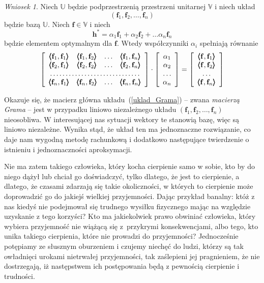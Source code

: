 \documentclass[12pt]{mwbk}
\theoremstyle{plain}
\theoremstyle{definition}
\theoremstyle{remark}
\newtheorem{wniosek}{Wniosek}[chapter]
\newcommand{\ff}{\mathbf{f}}
\newcommand{\hh}{\mathbf{h}}
\newcommand{\skalar}[2]{\pmb{\langle}#1,#2\pmb{\rangle}}
\begin{document}
\begin{wniosek}
	Niech $\mathbb{U}$ będzie podprzestrzenią przestrzeni
	unitarnej $\mathbb{V}$ i niech układ \[(\ff_1,\ff_2,
	\ldots,\ff_n)\] będzie bazą $\mathbb{U}$. Niech
	$\ff\in\mathbb{V}$ i niech 
	\[
	\hh^*=
	\alpha_1\ff_1 +
	\alpha_2\ff_2 +
	\ldots
	\alpha_n\ff_n
	\]
	będzie elementem optymalnym dla $\ff$. Wtedy współczynniki
	$\alpha_i$ spełniają równanie
	\begin{equation}
		\left[
		\begin{array}{cccc}
			\skalar{\ff_1}{\ff_1} &
			\skalar{\ff_1}{\ff_2} &
			\ldots &
			\skalar{\ff_1}{\ff_n} \\
			\skalar{\ff_2}{\ff_1} &
			\skalar{\ff_2}{\ff_2} &
			\ldots &
			\skalar{\ff_2}{\ff_n} \\
			\multicolumn{4}{c}{\dotfill} \\
			\skalar{\ff_n}{\ff_1} &
			\skalar{\ff_n}{\ff_2} &
			\ldots &
			\skalar{\ff_n}{\ff_n} 
		\end{array}
		\right]
		\cdot
		\left[
		\begin{array}{c}
			\alpha_1 \\
			\alpha_2 \\
			\ldots \\
			\alpha_n \\
		\end{array}
		\right]
		=
		\left[
		\begin{array}{c}
			\skalar{\ff}{\ff_1}\\
			\skalar{\ff}{\ff_2}\\
			\ldots \\
			\skalar{\ff}{\ff_n}
		\end{array}
		\right]
		\label{uklad_Grama}
	\end{equation}
\end{wniosek}


Okazuje się, że macierz główna układu~(\ref{uklad_Grama}) -- zwana
\emph{macierzą Grama} -- jest w przypadku liniowo niezależnego układu
$(\ff_1,\ff_2,\ldots,\ff_n)$ nieosobliwa. W interesującej nas sytuacji
wektory te stanowią bazę, więc są liniowo niezależne. Wynika stąd, że
układ ten ma jednoznaczne rozwiązanie, co daje nam wygodną metodę
rachunkową i dodatkowo następujące twierdzenie o istnieniu i
jednoznaczności aproksymacji.

Nie ma zatem takiego człowieka, który kocha cierpienie samo w sobie, 
kto by do niego dążył lub chciał go doświadczyć, tylko dlatego, że
jest to cierpienie, a dlatego, że czasami zdarzają się takie 
okoliczności, w których to cierpienie może doprowadzić 
go do jakiejś wielkiej przyjemności. 
Dając przykład banalny: któż z nas kiedyś nie podejmował 
się trudnego wysiłku fizycznego mając na względzie 
uzyskanie z tego korzyści? 
Kto ma jakiekolwiek prawo obwiniać człowieka, 
który wybiera przyjemność nie wiążącą się z~przykrymi 
konsekwencjami, albo tego, kto unika takiego cierpienia, 
które nie prowadzi do przyjemności? 
Jednocześnie potępiamy ze słusznym oburzeniem i czujemy 
niechęć do ludzi, którzy są tak owładnięci urokami nietrwałej 
przyjemności, tak zaślepieni jej pragnieniem, 
że nie dostrzegają, iż następstwem ich 
postępowania będą z pewnością cierpienie i trudności.
\end{document}
